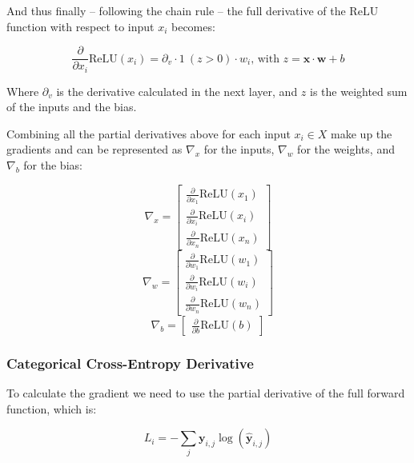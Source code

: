 \documentclass[a4paper]{article}
\newcommand{\vect}[1]{\bm{#1}}
\newcommand{\relu}{\text{ReLU}}
\begin{document}
And thus finally -- following the chain rule -- the full derivative of the $\relu$ function with respect to input $x_i$ becomes:

\begin{equation*}{}
    \frac{\partial}{\partial x_i}\relu(x_i) = \partial_v \cdot 1 \: (z > 0) \cdot w_i \text {, with } z = \vect{x} \cdot \vect{w} + b
\end{equation*}

Where $\partial_v$ is the derivative calculated in the next layer, and $z$ is the weighted sum of the inputs and the bias.

Combining all the partial derivatives above for each input $x_i \in X$ make up the gradients and can be represented as $\nabla_x$ for the inputs, $\nabla_w$ for the weights, and $\nabla_b$ for the bias:

\begin{equation*}
    \nabla_x = 
    \begin{bmatrix}
        \frac{\partial}{\partial x_1}\relu(x_1)\\
        \frac{\partial}{\partial x_i}\relu(x_i)\\
        \frac{\partial}{\partial x_n}\relu(x_n)
    \end{bmatrix}
\end{equation*}
\begin{equation*}
    \nabla_w = 
    \begin{bmatrix}
        \frac{\partial}{\partial w_1}\relu(w_1)\\
        \frac{\partial}{\partial w_i}\relu(w_i)\\
        \frac{\partial}{\partial w_n}\relu(w_n)
    \end{bmatrix}
\end{equation*}
\begin{equation*}
    \nabla_b = 
    \begin{bmatrix}
        \frac{\partial}{\partial b}\relu(b)
    \end{bmatrix}
\end{equation*}

\subsubsection*{Categorical Cross-Entropy Derivative}

To calculate the gradient we need to use the partial derivative of the full forward function, which is:

\begin{equation*}
    L_i = -\sum_{j} \vect{y}_{i,j} \log(\vect{\hat{y}}_{i,j})
\end{equation*}
\end{document}
